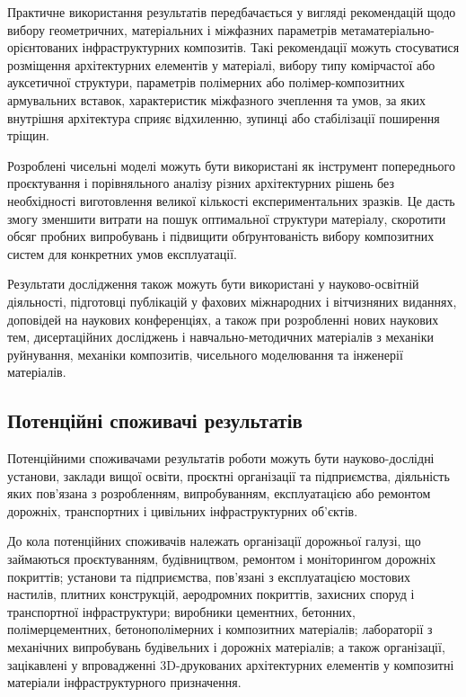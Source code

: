 \documentclass[12pt,a4paper]{article}
\begin{document}
Практичне використання результатів передбачається у вигляді рекомендацій щодо вибору геометричних, матеріальних і міжфазних параметрів метаматеріально-орієнтованих інфраструктурних композитів. Такі рекомендації можуть стосуватися розміщення архітектурних елементів у матеріалі, вибору типу комірчастої або ауксетичної структури, параметрів полімерних або полімер-композитних армувальних вставок, характеристик міжфазного зчеплення та умов, за яких внутрішня архітектура сприяє відхиленню, зупинці або стабілізації поширення тріщин.

Розроблені чисельні моделі можуть бути використані як інструмент попереднього проєктування і порівняльного аналізу різних архітектурних рішень без необхідності виготовлення великої кількості експериментальних зразків. Це дасть змогу зменшити витрати на пошук оптимальної структури матеріалу, скоротити обсяг пробних випробувань і підвищити обґрунтованість вибору композитних систем для конкретних умов експлуатації.

Результати дослідження також можуть бути використані у науково-освітній діяльності, підготовці публікацій у фахових міжнародних і вітчизняних виданнях, доповідей на наукових конференціях, а також при розробленні нових наукових тем, дисертаційних досліджень і навчально-методичних матеріалів з механіки руйнування, механіки композитів, чисельного моделювання та інженерії матеріалів.

\subsection{Потенційні споживачі результатів}

Потенційними споживачами результатів роботи можуть бути науково-дослідні установи, заклади вищої освіти, проєктні організації та підприємства, діяльність яких пов'язана з розробленням, випробуванням, експлуатацією або ремонтом дорожніх, транспортних і цивільних інфраструктурних об'єктів.

До кола потенційних споживачів належать організації дорожньої галузі, що займаються проєктуванням, будівництвом, ремонтом і моніторингом дорожніх покриттів; установи та підприємства, пов'язані з експлуатацією мостових настилів, плитних конструкцій, аеродромних покриттів, захисних споруд і транспортної інфраструктури; виробники цементних, бетонних, полімерцементних, бетонополімерних і композитних матеріалів; лабораторії з механічних випробувань будівельних і дорожніх матеріалів; а також організації, зацікавлені у впровадженні 3D-друкованих архітектурних елементів у композитні матеріали інфраструктурного призначення.
\end{document}
